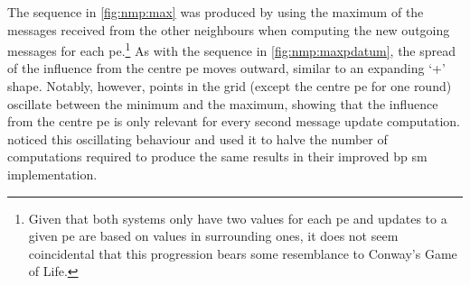 The sequence in \cref{fig:nmp:max} was produced by using the maximum of the messages received from the other neighbours when computing the new outgoing messages for each \gls{pe}.\footnote{Given that both systems only have two values for each \gls{pe} and updates to a given \gls{pe} are based on values in surrounding ones, it does not seem coincidental that this progression bears some resemblance to Conway's Game of Life.}  As with the sequence in \cref{fig:nmp:maxpdatum}, the spread of the influence from the centre \gls{pe} moves outward, similar to an expanding `+' shape.  Notably, however, points in the grid (except the centre \gls{pe} for one round) oscillate between the minimum and the maximum, showing that the influence from the centre \gls{pe} is only relevant for every second message update computation.  \citeauthor{Felzenszwalb2006} \cite{Felzenszwalb2006} noticed this oscillating behaviour and used it to halve the number of computations required to produce the same results in their improved \gls{bp} \gls{sm} implementation.

